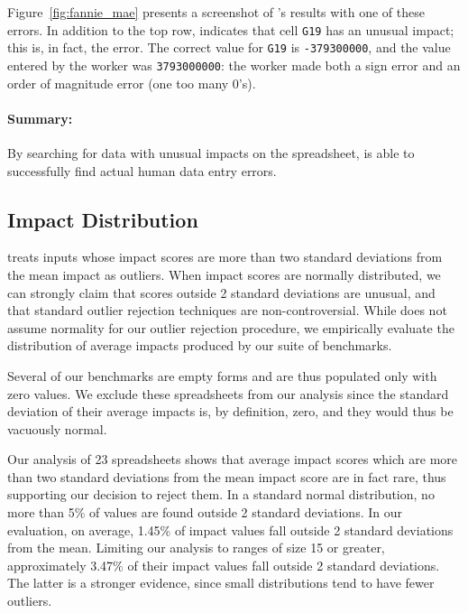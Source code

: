 Figure~\ref{fig:fannie_mae} presents a screenshot of \checkcell{}'s
results with one of these errors. In addition to the top
row, \checkcell{} indicates that cell \texttt{G19} has an unusual
impact; this is, in fact, the error. The correct value
for \texttt{G19} is \texttt{-379300000}, and the value entered by the
worker was \texttt{3793000000}: the worker made both a sign error and
an order of magnitude error (one too many 0's).

\paragraph{Summary:} By searching for data with unusual impacts on the spreadsheet, \checkcell{} is able to successfully find actual human data entry errors.

\subsection{Impact Distribution}
\label{sec:impact_normal}

\checkcell{} treats inputs whose impact scores are more than two standard deviations from the mean impact as outliers.  When impact scores are normally distributed, we can strongly claim that scores outside 2 standard deviations are unusual, and that standard outlier rejection techniques are non-controversial.  While \checkcell{} does not assume normality for our outlier rejection procedure, we empirically evaluate the distribution of average impacts produced by our suite of benchmarks.

Several of our benchmarks are empty forms and are thus populated only with zero values.  We exclude these spreadsheets from our analysis since the standard deviation of their average impacts is, by definition, zero, and they would thus be vacuously normal.

Our analysis of 23 spreadsheets shows that average impact scores which are more than two standard deviations from the mean impact score are in fact rare, thus supporting our decision to reject them.  In a standard normal distribution, no more than 5\% of values are found outside 2 standard deviations.  In our evaluation, on average, 1.45\% of impact values fall outside 2 standard deviations from the mean.  Limiting our analysis to ranges of size 15 or greater, approximately 3.47\% of their impact values fall outside 2 standard deviations.  The latter is a stronger evidence, since small distributions tend to have fewer outliers.

